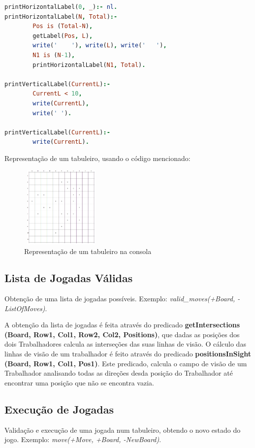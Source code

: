 \documentclass[a4paper]{article}
\begin{document}
\begin{lstlisting}[language=prolog]
printHorizontalLabel(0, _):- nl.
printHorizontalLabel(N, Total):-
        Pos is (Total-N),
        getLabel(Pos, L),
        write('    '), write(L), write('   '),
        N1 is (N-1),
        printHorizontalLabel(N1, Total).        

printVerticalLabel(CurrentL):-
        CurrentL < 10,
        write(CurrentL),
        write(' ').

printVerticalLabel(CurrentL):-
        write(CurrentL).

\end{lstlisting}

Representação de um tabuleiro, usando o código mencionado:\newline

\begin{figure}[h!]
\begin{center}
	\includegraphics[height=4cm, width=4cm]{images/self_semi_board.png}
	\caption{Representação de um tabuleiro na consola}
	\label{Figura 9}
\end{center}
\end{figure}

\newpage

\subsection{Lista de Jogadas Válidas} Obtenção de uma lista de jogadas possíveis. Exemplo: \textit{valid\_moves(+Board, -ListOfMoves)}.

A obtenção da lista de jogadas é feita através do predicado \textbf{getIntersections (Board, Row1, Col1, Row2, Col2, Positions)}, que dadas as posições dos dois Trabalhadores calcula as interseções das suas linhas de visão. O cálculo das linhas de visão de um trabalhador é feito através do predicado \textbf{positionsInSight (Board, Row1, Col1, Pos1)}. Este predicado, calcula o campo de visão de um Trabalhador analisando todas as direções desda posição do Trabalhador até encontrar uma posição que não se encontra vazia.

\newpage

\subsection{Execução de Jogadas} Validação e execução de uma jogada num tabuleiro, obtendo o novo estado do jogo. Exemplo: \textit{move(+Move, +Board, -NewBoard)}.
\end{document}

